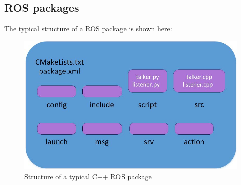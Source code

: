 \documentclass[../../main]{subfiles}
\begin{document}
\subsection{ROS packages}
The typical structure of a ROS package is shown here:
\begin{figure}[ht]
    \centering
    \includegraphics{img/rospkg.jpg}
    \caption{Structure of a typical C++ ROS package}
\end{figure}
\end{document}
